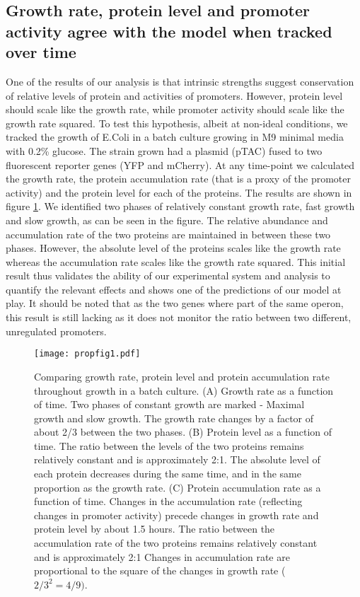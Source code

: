\documentclass[a4page]{report}
\begin{document}
\subsection{Growth rate, protein level and promoter activity agree with the model when tracked over time}
One of the results of our analysis is that intrinsic strengths suggest conservation of relative levels of protein and activities of promoters.
However, protein level should scale like the growth rate, while promoter activity should scale like the growth rate squared.
To test this hypothesis, albeit at non-ideal conditions, we tracked the growth of E.Coli in a batch culture growing in M9 minimal media with 0.2\% glucose.
The strain grown had a plasmid (pTAC) fused to two fluorescent reporter genes (YFP and mCherry).
At any time-point we calculated the growth rate, the protein accumulation rate (that is a proxy of the promoter activity) and the protein level for each of the proteins.
The results are shown in figure \ref{time-gr-fig}.
We identified two phases of relatively constant growth rate, fast growth and slow growth, as can be seen in the figure.
The relative abundance and accumulation rate of the two proteins are maintained in between these two phases.
However, the absolute level of the proteins scales like the growth rate whereas the accumulation rate scales like the growth rate squared.
This initial result thus validates the ability of our experimental system and analysis to quantify the relevant effects and shows one of the predictions of our model at play.
It should be noted that as the two genes where part of the same operon, this result is still lacking as it does not monitor the ratio between two different, unregulated promoters.
\begin{figure}[h]
\texttt{[image: propfig1.pdf]}
\caption{Comparing growth rate, protein level and protein accumulation rate throughout growth in a batch culture.
(A) Growth rate as a function of time.
Two phases of constant growth are marked - Maximal growth and slow growth.
The growth rate changes by a factor of about 2/3 between the two phases.
(B) Protein level as a function of time.
The ratio between the levels of the two proteins remains relatively constant and is approximately 2:1.
The absolute level of each protein decreases during the same time, and in the same proportion as the growth rate.
(C) Protein accumulation rate as a function of time.
Changes in the accumulation rate (reflecting changes in promoter activity) precede changes in growth rate and protein level by about 1.5 hours.
The ratio between the accumulation rate of the two proteins remains relatively constant and is approximately 2:1
Changes in accumulation rate are proportional to the square of the changes in growth rate ($2/3^2=4/9)$.}
\label{time-gr-fig}
\end{figure}
\end{document}
